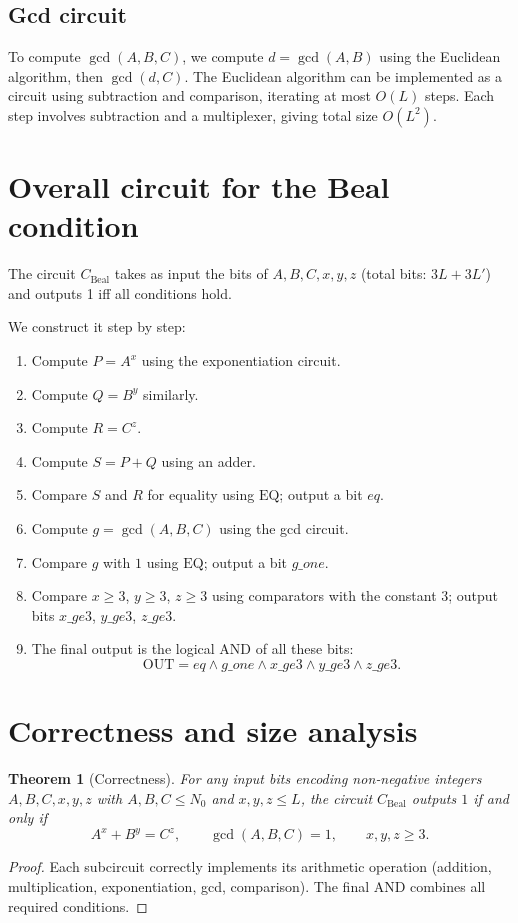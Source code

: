 \documentclass[11pt,a4paper]{article}
\newtheorem{theorem}{Theorem}[section]
\begin{document}
\subsection{Gcd circuit}

To compute \(\gcd(A,B,C)\), we compute \(d = \gcd(A,B)\) using the Euclidean algorithm, then \(\gcd(d,C)\). The Euclidean algorithm can be implemented as a circuit using subtraction and comparison, iterating at most \(O(L)\) steps. Each step involves subtraction and a multiplexer, giving total size \(O(L^2)\).

\section{Overall circuit for the Beal condition}

The circuit \(C_{\text{Beal}}\) takes as input the bits of \(A,B,C,x,y,z\) (total bits: \(3L + 3L'\)) and outputs 1 iff all conditions hold.

We construct it step by step:

\begin{enumerate}
\item Compute \(P = A^x\) using the exponentiation circuit.
\item Compute \(Q = B^y\) similarly.
\item Compute \(R = C^z\).
\item Compute \(S = P + Q\) using an adder.
\item Compare \(S\) and \(R\) for equality using \(\mathrm{EQ}\); output a bit \(eq\).
\item Compute \(g = \gcd(A,B,C)\) using the gcd circuit.
\item Compare \(g\) with \(1\) using \(\mathrm{EQ}\); output a bit \(g\_one\).
\item Compare \(x \ge 3\), \(y \ge 3\), \(z \ge 3\) using comparators with the constant \(3\); output bits \(x\_ge3\), \(y\_ge3\), \(z\_ge3\).
\item The final output is the logical AND of all these bits:
   \[
   \mathrm{OUT} = eq \land g\_one \land x\_ge3 \land y\_ge3 \land z\_ge3.
   \]
\end{enumerate}

\section{Correctness and size analysis}

\begin{theorem}[Correctness]\label{thm:correct}
For any input bits encoding non‑negative integers \(A,B,C,x,y,z\) with \(A,B,C \le N_0\) and \(x,y,z \le L\), the circuit \(C_{\text{Beal}}\) outputs \(1\) if and only if
\[
A^x + B^y = C^z,\qquad \gcd(A,B,C)=1,\qquad x,y,z \ge 3.
\] 
\end{theorem}
\begin{proof}
Each subcircuit correctly implements its arithmetic operation (addition, multiplication, exponentiation, gcd, comparison). The final AND combines all required conditions.
\end{proof}
\end{document}
